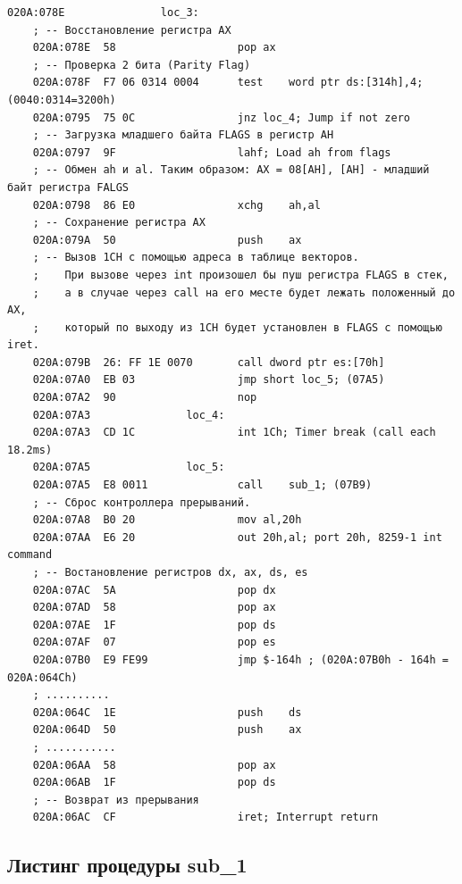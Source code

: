 \documentclass[a4paper,12pt]{article}
\begin{document}
\begin{lstlisting}[style={asm}]
	020A:078E               loc_3:
	; -- Восстановление регистра AX
	020A:078E  58                   pop ax
	; -- Проверка 2 бита (Parity Flag)
	020A:078F  F7 06 0314 0004      test    word ptr ds:[314h],4; (0040:0314=3200h)
	020A:0795  75 0C                jnz loc_4; Jump if not zero
	; -- Загрузка младшего байта FLAGS в регистр AH
	020A:0797  9F                   lahf; Load ah from flags
	; -- Обмен ah и al. Таким образом: AX = 08[AH], [AH] - младший байт регистра FALGS
	020A:0798  86 E0                xchg    ah,al
	; -- Сохранение регистра AX
	020A:079A  50                   push    ax
	; -- Вызов 1CH с помощью адреса в таблице векторов. 
	;    При вызове через int произошел бы пуш регистра FLAGS в стек, 
	;    а в случае через call на его месте будет лежать положенный до AX,
	;    который по выходу из 1CH будет установлен в FLAGS с помощью iret.
	020A:079B  26: FF 1E 0070       call dword ptr es:[70h]
	020A:07A0  EB 03                jmp short loc_5; (07A5)
	020A:07A2  90                   nop
	020A:07A3               loc_4:
	020A:07A3  CD 1C                int 1Ch; Timer break (call each 18.2ms)
	020A:07A5               loc_5:
	020A:07A5  E8 0011              call    sub_1; (07B9)
	; -- Сброс контроллера прерываний.
	020A:07A8  B0 20                mov al,20h
	020A:07AA  E6 20                out 20h,al; port 20h, 8259-1 int command
	; -- Востановление регистров dx, ax, ds, es
	020A:07AC  5A                   pop dx
	020A:07AD  58                   pop ax
	020A:07AE  1F                   pop ds
	020A:07AF  07                   pop es
	020A:07B0  E9 FE99              jmp $-164h ; (020A:07B0h - 164h = 020A:064Ch)
	; ..........
	020A:064C  1E                   push    ds
	020A:064D  50                   push    ax
	; ...........
	020A:06AA  58                   pop ax
	020A:06AB  1F                   pop ds
	; -- Возврат из прерывания
	020A:06AC  CF                   iret; Interrupt return
\end{lstlisting}

\clearpage
\subsection{Листинг процедуры sub\_1}
\end{document}
